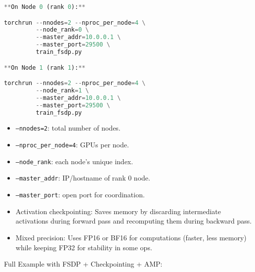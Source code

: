 \begin{lstlisting}[language=Python]
**On Node 0 (rank 0):**

torchrun --nnodes=2 --nproc_per_node=4 \
         --node_rank=0 \
         --master_addr=10.0.0.1 \
         --master_port=29500 \
         train_fsdp.py

**On Node 1 (rank 1):**

torchrun --nnodes=2 --nproc_per_node=4 \
         --node_rank=1 \
         --master_addr=10.0.0.1 \
         --master_port=29500 \
         train_fsdp.py
\end{lstlisting}
\begin{itemize}
	\item \texttt{--nnodes=2}: total number of nodes.
	\item \texttt{--nproc\_per\_node=4}: GPUs per node.
	\item \texttt{--node\_rank}: each node's unique index.
	\item \texttt{--master\_addr}: IP/hostname of rank 0 node.
	\item \texttt{--master\_port}: open port for coordination.
\end{itemize}

\begin{itemize}
	\item Activation checkpointing: Saves memory by discarding intermediate activations during forward pass and recomputing them during backward pass.
	\item Mixed precision: Uses FP16 or BF16 for computations (faster, less memory) while keeping FP32 for stability in some ops.
\end{itemize}

Full Example with FSDP + Checkpointing + AMP:

